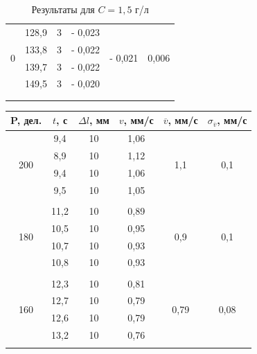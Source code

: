 \documentclass[a4paper, 12pt]{article}%
\begin{document}
\begin{enumerate}
\begin{longtable} {|c|c|c|c|c|c|}
		
		\multirow{4}{*}{0}& 128,9 & 3 & - 0,023 &  \multirow{4}{*}{- 0,021}    & \multirow{4}{*}{0,006}\\ \cline{2-4}
		& 133,8 & 3 &    - 0,022         &               &\\ \cline{2-4}
		& 139,7 & 3 &    - 0,022         &              & \\ \cline{2-4}
		& 149,5 & 3 &   - 0,020           &             &\\ \hline
		&&&&&\\ \hline
		\caption{Результаты для $ C = 1,5 $ г/л  }
	\end{longtable}
	
	
	\newpage
	
	
		\begin{longtable} {|c|c|c|c|c|c|}
		\hline
		P, дел. & $ t $, с &   $ \Delta l$, мм  & $v$,  мм/с   & $\overline v $, мм/с & $\sigma_{\overline v}$, мм/с\\ \hline
		\multirow{4}{*}{200}& 9,4 & 10 & 1,06 &  \multirow{4}{*}{1,1}    & \multirow{4}{*}{0,1}\\ \cline{2-4}
		& 8,9 & 10 &   1,12         &               &\\ \cline{2-4}
		& 9,4 & 10 &     1,06         &              & \\ \cline{2-4}
		& 9,5 & 10 &    1,05           &             &\\ \hline
		&&&&&\\ \hline
		
		\multirow{4}{*}{180}& 11,2 & 10 & 0,89 &  \multirow{4}{*}{0,9}    & \multirow{4}{*}{0,1}\\ \cline{2-4}
		& 10,5 & 10 &    0,95         &               &\\ \cline{2-4}
		& 10,7 & 10 &     0,93         &              & \\ \cline{2-4}
		& 10,8 & 10 &    0,93           &             &\\ \hline
		&&&&&\\ \hline
		
		\multirow{4}{*}{160}& 12,3 & 10 & 0,81 &  \multirow{4}{*}{0,79}    & \multirow{4}{*}{0,08}\\ \cline{2-4}
		& 12,7 & 10 &    0,79         &               &\\ \cline{2-4}
		& 12,6 & 10 &     0,79         &              & \\ \cline{2-4}
		& 13,2 & 10 &    0,76           &             &\\ \hline
		&&&&&\\ \hline
		

\end{longtable}
\end{enumerate}
\end{document}
